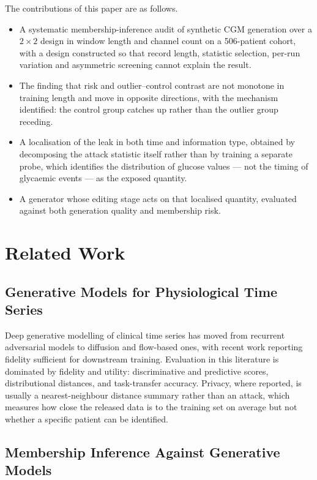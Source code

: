 \documentclass[journal]{IEEEtran}
\begin{document}
The contributions of this paper are as follows.

\begin{itemize}
\item A systematic membership-inference audit of synthetic CGM generation over a
$2\times2$ design in window length and channel count on a 506-patient cohort, with a
design constructed so that record length, statistic selection, per-run variation and
asymmetric screening cannot explain the result.
\item The finding that risk and outlier--control contrast are not monotone in training
length and move in opposite directions, with the mechanism identified: the control group
catches up rather than the outlier group receding.
\item A localisation of the leak in both time and information type, obtained by
decomposing the attack statistic itself rather than by training a separate probe, which
identifies the distribution of glucose values --- not the timing of glycaemic events ---
as the exposed quantity.
\item A generator whose editing stage acts on that localised quantity, evaluated against
both generation quality and membership risk.
\end{itemize}

\section{Related Work}

\subsection{Generative Models for Physiological Time Series}

Deep generative modelling of clinical time series has moved from recurrent adversarial
models to diffusion and flow-based ones, with recent work reporting fidelity sufficient
for downstream training. Evaluation in this literature is dominated by fidelity and
utility: discriminative and predictive scores, distributional distances, and
task-transfer accuracy. Privacy, where reported, is usually a nearest-neighbour distance
summary rather than an attack, which measures how close the released data is to the
training set on average but not whether a specific patient can be identified.

\subsection{Membership Inference Against Generative Models}
\end{document}

